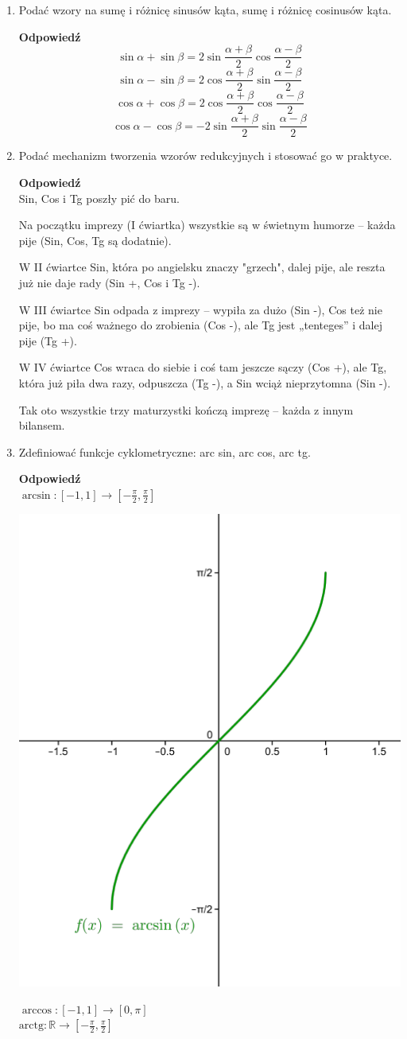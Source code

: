 \documentclass[12pt,a4paper]{article}
\theoremstyle{break}
\newcommand{\Odp}[1]{
		\begin{mdframed}[style=zadanie]
			\textbf{Odpowiedź}\\
			#1
		\end{mdframed}
	}
\newcommand{\arctg}{\text{arctg}}
\begin{document}
\begin{enumerate}[1.]
	\item Podać wzory na sumę i różnicę sinusów kąta, sumę i różnicę cosinusów kąta.
	\Odp{
		$$\sin\alpha+\sin\beta=2\sin\frac{\alpha+\beta}{2}\cos\frac{\alpha-\beta}{2}$$
		$$\sin\alpha-\sin\beta=2\cos\frac{\alpha+\beta}{2}\sin\frac{\alpha-\beta}{2}$$
		$$\cos\alpha+\cos\beta=2\cos\frac{\alpha+\beta}{2}\cos\frac{\alpha-\beta}{2}$$
		$$\cos\alpha-\cos\beta=-2\sin\frac{\alpha+\beta}{2}\sin\frac{\alpha-\beta}{2}$$
	}
	
	\item Podać mechanizm tworzenia wzorów redukcyjnych i stosować go w praktyce.
	\Odp{
		Sin, Cos i Tg poszły pić do baru.
		
		Na początku imprezy (I ćwiartka) wszystkie są w świetnym humorze – każda pije (Sin, Cos, Tg są dodatnie).
		
		W II ćwiartce Sin, która po angielsku znaczy "grzech", dalej pije, ale reszta już nie daje rady (Sin +, Cos i Tg -).
		
		W III ćwiartce Sin odpada z imprezy – wypiła za dużo (Sin -), Cos też nie pije, bo ma coś ważnego do zrobienia (Cos -), ale Tg jest „tenteges” i dalej pije (Tg +).
		
		W IV ćwiartce Cos wraca do siebie i coś tam jeszcze sączy (Cos +), ale Tg, która już piła dwa razy, odpuszcza (Tg -), a Sin wciąż nieprzytomna (Sin -).
		
		Tak oto wszystkie trzy maturzystki kończą imprezę – każda z innym bilansem.
	}
	\newpage
	\item Zdeﬁniować funkcje cyklometryczne: arc sin, arc cos, arc tg.
	\Odp{
		$\arcsin: [-1,1] \rightarrow [-\frac{\pi}{2},\frac{\pi}{2}]$
		
		\includegraphics[width=0.4\linewidth]{arcsin.png}
		
		$\arccos: [-1,1] \rightarrow [0,\pi]$\\
		
		$\arctg: \mathbb{R} \rightarrow [-\frac{\pi}{2},\frac{\pi}{2}]$\\
		
}
\end{enumerate}
\end{document}
